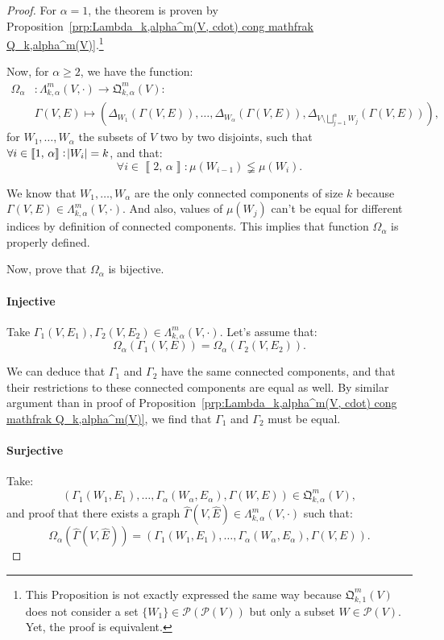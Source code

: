\documentclass{article}
\theoremstyle{definition}
\theoremstyle{remark}
\newcommand{\intint}[2]{\left\llbracket#1, \, #2\right\rrbracket}
\begin{document}
		\begin{proof} For $\alpha=1$, the theorem is proven by Proposition~\ref{prp:Lambda_k,alpha^m(V, cdot) cong mathfrak Q_k,alpha^m(V)}.\footnote{This Proposition is not exactly
		expressed the same way because $\mathfrak Q_{k,1}^m(V)$ does not consider a set $\{W_1\} \in \mathcal P\left(\mathcal P(V)\right)$ but only a subset $W \in \mathcal P(V)$.
		Yet, the proof is equivalent.}

		Now, for $\alpha \geq 2$, we have the function:
		\begin{align*}
			\Omega_\alpha &: \Lambda_{k,\alpha}^m(V, \cdot) \to \mathfrak Q_{k,\alpha}^m(V) : \\
			&\Gamma(V, E) \mapsto \left(\Delta_{W_1}(\Gamma(V, E)), \ldots, \Delta_{W_\alpha}(\Gamma(V, E)), \Delta_{V \setminus \bigsqcup_{j=1}^\alpha W_j}(\Gamma(V, E))\right),
		\end{align*}
		for $W_1, \ldots, W_\alpha$ the subsets of $V$ two by two disjoints, such that $\forall i \in \intint 1\alpha : \abs {W_i}=k$, and that:
		\[\forall i \in \intint 2\alpha : \mu(W_{i-1}) \lneqq \mu(W_i).\]

		We know that $W_1, \ldots, W_\alpha$ are the only connected components of size $k$ because $\Gamma(V, E) \in \Lambda_{k,\alpha}^m(V, \cdot)$. And also,
		values of $\mu(W_j)$ can't be equal for different indices by definition of connected components. This implies that function $\Omega_\alpha$ is properly
		defined.

		Now, prove that $\Omega_\alpha$ is bijective.

		\paragraph{Injective} Take $\Gamma_1(V, E_1), \Gamma_2(V, E_2) \in \Lambda_{k,\alpha}^m(V, \cdot)$. Let's assume that:
		\[\Omega_\alpha(\Gamma_1(V, E)) = \Omega_\alpha(\Gamma_2(V, E_2)).\]

		We can deduce that $\Gamma_1$ and $\Gamma_2$ have the same connected components, and that their restrictions to these connected components are equal as well.
		By similar argument than in proof of Proposition~\ref{prp:Lambda_k,alpha^m(V, cdot) cong mathfrak Q_k,alpha^m(V)}, we find that $\Gamma_1$ and $\Gamma_2$ must be equal.

		\paragraph{Surjective} Take:
		\[\left(\Gamma_1(W_1, E_1), \ldots, \Gamma_\alpha(W_\alpha, E_\alpha), \Gamma(W, E)\right) \in \mathfrak Q_{k,\alpha}^m(V),\]
		and proof that there exists a graph $\hat \Gamma(V, \hat E) \in \Lambda_{k,\alpha}^m(V, \cdot)$ such that:
		\[\Omega_\alpha(\hat \Gamma(V, \hat E)) = \left(\Gamma_1(W_1, E_1), \ldots, \Gamma_\alpha(W_\alpha, E_\alpha), \Gamma(V, E)\right).\]


\end{proof}
\end{document}
